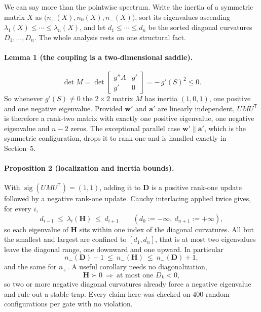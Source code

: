 \documentclass[11pt]{article}
\newcommand{\tp}{^{\mathsf T}}
\begin{document}
We can say more than the pointwise spectrum. Write the inertia of a symmetric matrix $X$
as $\bigl(n_+(X),n_0(X),n_-(X)\bigr)$, sort its eigenvalues ascending
$\lambda_1(X)\le\cdots\le\lambda_n(X)$, and let $d_1\le\cdots\le d_n$ be the sorted diagonal
curvatures $D_1,\dots,D_n$. The whole analysis rests on one structural fact.

\paragraph{Lemma 1 (the coupling is a two-dimensional saddle).}
\[
\det M=\det\!\begin{bmatrix} g''A & g' \\ g' & 0 \end{bmatrix}=-\,g'(S)^2\le0 .
\]
So whenever $g'(S)\ne0$ the $2\times2$ matrix $M$ has inertia $(1,0,1)$, one positive and
one negative eigenvalue. Provided $\mathbf{w}'$ and $\mathbf{a}'$ are linearly independent,
$UMU\tp$ is therefore a rank-two matrix with exactly one positive eigenvalue, one negative
eigenvalue and $n-2$ zeros. The exceptional parallel case $\mathbf{w}'\parallel\mathbf{a}'$,
which is the symmetric configuration, drops it to rank one and is handled exactly in
Section~5.

\paragraph{Proposition 2 (localization and inertia bounds).}
With $\operatorname{sig}(UMU\tp)=(1,1)$, adding it to $\mathbf{D}$ is a positive rank-one
update followed by a negative rank-one update. Cauchy interlacing applied twice gives, for
every $i$,
\[
d_{i-1}\ \le\ \lambda_i(\mathbf{H})\ \le\ d_{i+1}
\qquad(d_0:=-\infty,\ d_{n+1}:=+\infty),
\]
so each eigenvalue of $\mathbf{H}$ sits within one index of the diagonal curvatures. All but
the smallest and largest are confined to $[d_1,d_n]$, that is at most two eigenvalues leave
the diagonal range, one downward and one upward. In particular
\[
n_-(\mathbf{D})-1\ \le\ n_-(\mathbf{H})\ \le\ n_-(\mathbf{D})+1 ,
\]
and the same for $n_+$. A useful corollary needs no diagonalization,
\[
\mathbf{H}\succ0\ \Longrightarrow\ \text{at most one }D_k<0 ,
\]
so two or more negative diagonal curvatures already force a negative eigenvalue and rule out
a stable trap. Every claim here was checked on $400$ random configurations per gate with no
violation.
\end{document}
